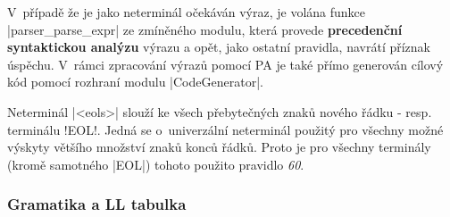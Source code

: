 V~případě že je jako neterminál očekáván výraz, je volána funkce \ic|parser_parse_expr| ze zmíněného modulu, která provede \textbf{precedenční syntaktickou analýzu} výrazu a opět, jako ostatní pravidla, navrátí příznak úspěchu. V~rámci zpracování výrazů pomocí PA je také přímo generován cílový kód pomocí rozhraní modulu \ic|CodeGenerator|.

Neterminál \ic|<eols>| slouží ke  všech přebytečných znaků nového řádku - resp. terminálu \ic!EOL!. Jedná se o~univerzální neterminál použitý pro všechny možné výskyty většího množství znaků konců řádků. Proto je pro všechny terminály (kromě samotného \ic|EOL|) tohoto použito pravidlo \emph{60}.

\subsubsection{Gramatika a LL tabulka}
